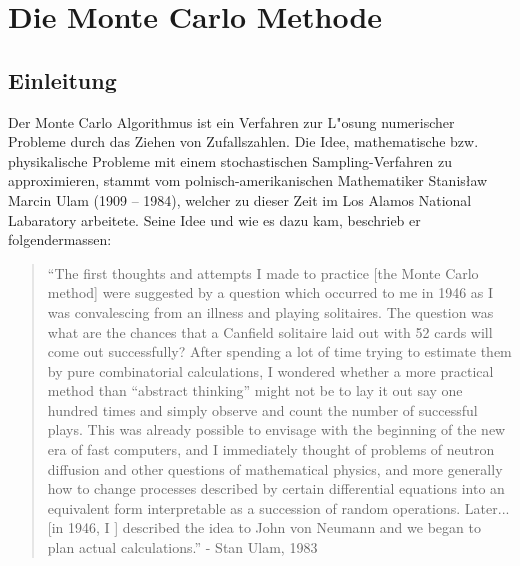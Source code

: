 \chapter{Die Monte Carlo Methode}
\begin{refsection}

\section{Einleitung}
Der Monte Carlo Algorithmus ist ein Verfahren zur L"osung numerischer
Probleme durch das Ziehen von Zufallszahlen. Die Idee, mathematische
bzw. physikalische Probleme mit einem stochastischen Sampling-Verfahren
zu approximieren, stammt vom polnisch-amerikanischen Mathematiker
Stanisław Marcin Ulam (1909 -- 1984), welcher zu dieser Zeit im Los
Alamos National Labaratory arbeitete. Seine Idee und wie es dazu kam,
beschrieb er folgendermassen:

\begin{quote}
``The first thoughts and attempts I made to practice [the
Monte Carlo method] were suggested by a question which occurred to me in
1946 as I was convalescing from an illness and playing solitaires. The
question was what are the chances that a Canfield solitaire laid out with
52 cards will come out successfully? After spending a lot of time trying
to estimate them by pure combinatorial calculations, I wondered whether
a more practical method than “abstract thinking” might not be to lay
it out say one hundred times and simply observe and count the number of
successful plays. This was already possible to envisage with the beginning
of the new era of fast computers, and I immediately thought of problems
of neutron diffusion and other questions of mathematical physics, and
more generally how to change processes described by certain differential
equations into an equivalent form interpretable as a succession of random
operations. Later... [in 1946, I ] described the idea to John von Neumann
and we began to plan actual calculations.'' - Stan Ulam, 1983
\end{quote}


\end{refsection}
